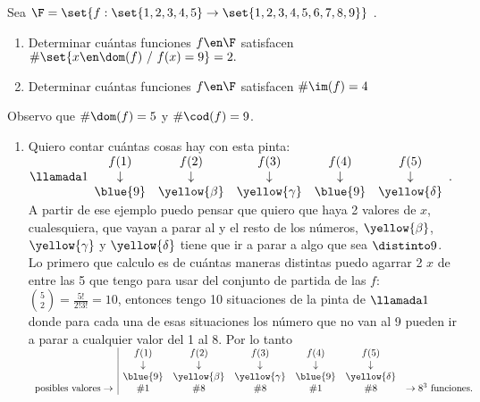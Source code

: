 \begin{enunciado}{\ejExtra}
  Sea
  $\F = \set{f: \set{1,2,3,4,5} \to \set{1,2,3,4,5,6,7,8,9}}$ .

  \begin{enumerate}[label=\alph*)]
    \item Determinar cuántas funciones
          $f \en \F$ satisfacen $\# \set{x \en \dom(f)\ / \ f(x) = 9} = 2.$

    \item Determinar cuántas funciones
          $f \en \F$ satisfacen $\#\im(f) = 4$
  \end{enumerate}

\end{enunciado}

Observo que $\#\dom(f) = 5$ y $\#\cod(f) = 9$.

\begin{enumerate}[label=\alph*)]
  \item  Quiero contar cuántas cosas hay con esta pinta:
        $\llamada1
          \begin{array}{ccccc}
            f(1)       & f(2)           & f(3)            & f(4)       & f(5)            \\
            \downarrow & \downarrow     & \downarrow      & \downarrow & \downarrow      \\
            \blue{9}   & \yellow{\beta} & \yellow{\gamma} & \blue{9}   & \yellow{\delta}
          \end{array}.
        $\\
        A partir de ese ejemplo puedo pensar que quiero que haya 2 valores de $x$, cualesquiera, que vayan a
        parar al  y el resto de los números, $\yellow{\beta}$, $\yellow{\gamma}$ y $\yellow{\delta}$
        tiene que ir a parar a algo que sea $\distinto 9$.\\
        Lo primero que calculo es de cuántas maneras distintas puedo agarrar 2 $x$ de entre las 5 que tengo
        para usar del conjunto de partida de las $f$:
        $\binom{5}{2} = \frac{5!}{2!3!} = 10$, entonces tengo 10 situaciones de la pinta de $\llamada1$ donde para
        cada una de esas situaciones los número que no van al 9 pueden ir a parar a cualquier valor del 1 al 8. Por lo tanto
        $\begin{array}{c|cccccc}
                                       & f(1)       & f(2)           & f(3)            & f(4)       & f(5)            &                            \\
                                       & \downarrow & \downarrow     & \downarrow      & \downarrow & \downarrow      &                            \\
                                       & \blue{9}   & \yellow{\beta} & \yellow{\gamma} & \blue{9}   & \yellow{\delta} &                            \\
            \text{posibles valores}\to & \#1        & \#8            & \#8             & \#1        & \#8             & \to 8^3 \text{ funciones}.
          \end{array}
        $


\end{enumerate}
